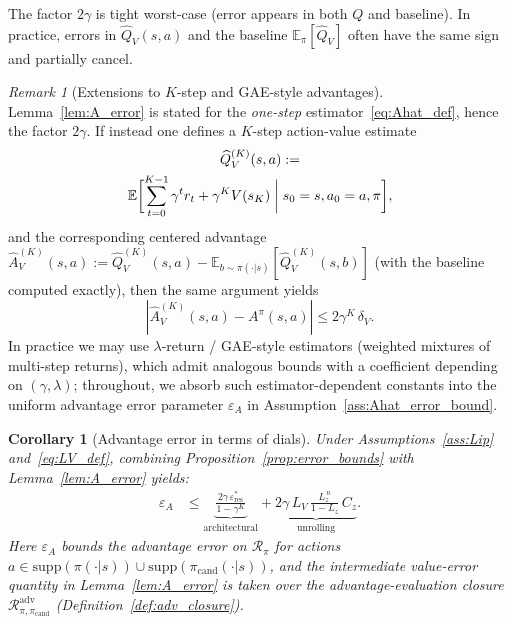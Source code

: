\documentclass{article}
\theoremstyle{plain}
\newtheorem{corollary}[theorem]{Corollary}
\theoremstyle{definition}
\theoremstyle{remark}
\newtheorem{remark}[theorem]{Remark}
\newcommand{\E}{\mathbb{E}}
\begin{document}
{The factor $2\gamma$ is tight worst-case (error appears in both $Q$ and baseline).
In practice, errors in $\widehat Q_V(s,a)$ and the baseline $\E_\pi[\widehat Q_V]$ often have the same sign and partially cancel.
\begin{remark}[Extensions to $K$-step and GAE-style advantages]
\label{rem:A_error_kstep}
Lemma~\ref{lem:A_error} is stated for the \emph{one-step} estimator~\eqref{eq:Ahat_def}, hence the factor $2\gamma$.
If instead one defines a $K$-step action-value estimate
\begin{multline*}
\widehat Q_V^{(K)}(s,a) := \\
\E\biggl[\sum_{t=0}^{K-1}\gamma^t r_t + \gamma^K V(s_K) \biggm| s_0=s, a_0=a, \pi\biggr],
\end{multline*}
and the corresponding centered advantage
$\widehat A_V^{(K)}(s,a):=\widehat Q_V^{(K)}(s,a)-\E_{b\sim\pi(\cdot|s)}[\widehat Q_V^{(K)}(s,b)]$
(with the baseline computed exactly), then the same argument yields
\[
|\widehat A_V^{(K)}(s,a)-A^\pi(s,a)| \le 2\gamma^K\,\delta_V.
\]
In practice we may use $\lambda$-return / GAE-style estimators (weighted mixtures of multi-step returns), which admit analogous bounds with a coefficient depending on $(\gamma,\lambda)$; throughout, we absorb such estimator-dependent constants into the uniform advantage error parameter $\varepsilon_A$ in Assumption~\ref{ass:Ahat_error_bound}.
\end{remark}

\begin{corollary}[Advantage error in terms of dials]
\label{cor:epsA_dials}
Under Assumptions~\ref{ass:Lip} and~\eqref{eq:LV_def}, combining Proposition~\ref{prop:error_bounds} with Lemma~\ref{lem:A_error} yields:
\begin{align}
\varepsilon_A
&\le
\underbrace{\frac{2\gamma\,\varepsilon_{\mathrm{res}}^*}{1-\gamma^K}}_{\text{architectural}}
+
\underbrace{2\gamma\,L_V\,\frac{L_z^{\,n}}{1-L_z}\,C_z}_{\text{unrolling}}.
\label{eq:epsA_dials}
\end{align}
Here $\varepsilon_A$ bounds the advantage error on $\mathcal{R}_\pi$ for actions
$a\in \mathrm{supp}(\pi(\cdot|s))\cup\mathrm{supp}(\pi_{\mathrm{cand}}(\cdot|s))$,
and the intermediate value-error quantity in Lemma~\ref{lem:A_error} is taken over the advantage-evaluation closure $\mathcal{R}_{\pi,\pi_{\mathrm{cand}}}^{\mathrm{adv}}$ (Definition~\ref{def:adv_closure}).
\end{corollary}}
\end{document}
